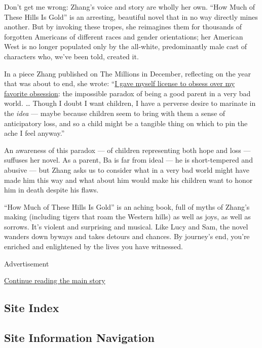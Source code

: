 Don't get me wrong: Zhang's voice and story are wholly her own. ``How
Much of These Hills Is Gold'' is an arresting, beautiful novel that in
no way directly mines another. But by invoking these tropes, she
reimagines them for thousands of forgotten Americans of different races
and gender orientations; her American West is no longer populated only
by the all-white, predominantly male cast of characters who, we've been
told, created it.

In a piece Zhang published on The Millions in December, reflecting on
the year that was about to end, she wrote:
``\href{https://themillions.com/2019/12/a-year-in-reading-c-pam-zhang.html}{I
gave myself license to obsess over my favorite obsession}: the
impossible paradox of being a good parent in a very bad world. \ldots{}
Though I doubt I want children, I have a perverse desire to marinate in
the \emph{idea} --- maybe because children seem to bring with them a
sense of anticipatory loss, and so a child might be a tangible thing on
which to pin the ache I feel anyway.''

An awareness of this paradox --- of children representing both hope and
loss --- suffuses her novel. As a parent, Ba is far from ideal --- he is
short-tempered and abusive --- but Zhang asks us to consider what in a
very bad world might have made him this way and what about him would
make his children want to honor him in death despite his flaws.

``How Much of These Hills Is Gold'' is an aching book, full of myths of
Zhang's making (including tigers that roam the Western hills) as well as
joys, as well as sorrows. It's violent and surprising and musical. Like
Lucy and Sam, the novel wanders down byways and takes detours and
chances. By journey's end, you're enriched and enlightened by the lives
you have witnessed.

Advertisement

\protect\hyperlink{after-bottom}{Continue reading the main story}

\hypertarget{site-index}{%
\subsection{Site Index}\label{site-index}}

\hypertarget{site-information-navigation}{%
\subsection{Site Information
Navigation}\label{site-information-navigation}}

